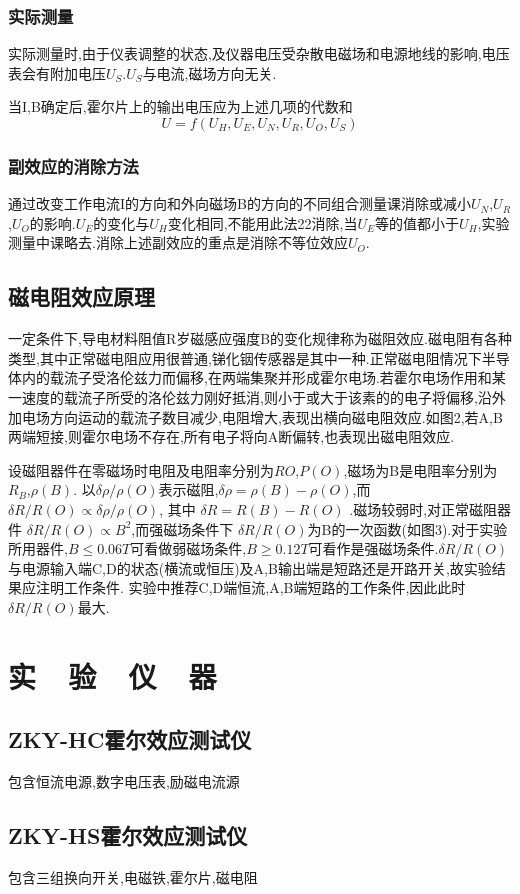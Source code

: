 \documentclass{thuemp}
\begin{document}
\subsubsection{实际测量}
实际测量时,由于仪表调整的状态,及仪器电压受杂散电磁场和电源地线的影响,电压表会有附加电压$U_{S}$.$U_{S}$与电流,磁场方向无关.


当I,B确定后,霍尔片上的输出电压应为上述几项的代数和
\[U=f(U_{H},U_{E},U_{N},U_{R},U_{O},U_{S})\]
\subsubsection{副效应的消除方法}
通过改变工作电流I的方向和外向磁场B的方向的不同组合测量课消除或减小$U_{N}$,$U_{R}$,$U_{O}$的影响.$U_{E}$的变化与$U_{H}$变化相同,不能用此法22消除,当$U_{E}$等的值都小于$U_{H}$,实验测量中课略去.消除上述副效应的重点是消除不等位效应$U_{O}$.
\subsection{磁电阻效应原理}
一定条件下,导电材料阻值R岁磁感应强度B的变化规律称为磁阻效应.磁电阻有各种类型,其中正常磁电阻应用很普通,锑化铟传感器是其中一种.正常磁电阻情况下半导体内的载流子受洛伦兹力而偏移,在两端集聚并形成霍尔电场.若霍尔电场作用和某一速度的载流子所受的洛伦兹力刚好抵消,则小于或大于该素的的电子将偏移,沿外加电场方向运动的载流子数目减少,电阻增大,表现出横向磁电阻效应.如图2,若A,B两端短接,则霍尔电场不存在,所有电子将向A断偏转,也表现出磁电阻效应.

设磁阻器件在零磁场时电阻及电阻率分别为$R{O}$,$P(O)$,磁场为B是电阻率分别为$R_{B}$,$\rho(B)$.
以$ \delta \rho/\rho(O) $表示磁阻,$ \delta \rho = \rho (B) - \rho(O) $,而$\delta R /R(O) \propto \delta \rho /\rho(O)$,
其中
$ \delta R = R(B)-R(O) $
.磁场较弱时,对正常磁阻器件
$\delta R /R(O)\propto B^{2}$,而强磁场条件下
$ \delta R /R(O)$为B的一次函数(如图3).对于实验所用器件,$ B \leq 0.06T$可看做弱磁场条件,$B\geq 0.12T$可看作是强磁场条件.$\delta R / R(O)$与电源输入端C,D的状态(横流或恒压)及A,B输出端是短路还是开路开关,故实验结果应注明工作条件.
实验中推荐C,D端恒流,A,B端短路的工作条件,因此此时$\delta R/R(O)$最大.
\section{实~~验~~仪~~器}
\subsection{ZKY-HC霍尔效应测试仪}
包含恒流电源,数字电压表,励磁电流源
\subsection{ZKY-HS霍尔效应测试仪}
包含三组换向开关,电磁铁,霍尔片,磁电阻
\end{document}
